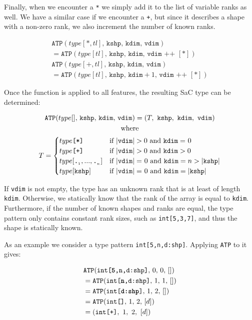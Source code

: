 \documentclass[sigconf,screen]{acmart}
\newcommand{\tpdot}{\texttt{\textbf{.}}}
\newcommand{\tpplus}{\texttt{+}}
\newcommand{\tpstar}{\texttt{*}}
\newcommand{\rest}{\ensuremath{tl}}
\newcommand{\atp}[4]{\ensuremath{\texttt{ATP}(#1,\,#2,\,#3,\,#4)}}
\newcommand{\fshp}{\texttt{kshp}}
\newcommand{\fdim}{\texttt{kdim}}
\newcommand{\vdim}{\texttt{vdim}}
\begin{document}
Finally, when we encounter a \tpstar{} we simply add it to the list of variable ranks as well.
We have a similar case if we encounter a \tpplus{}, but since it describes a shape with a non-zero rank, we also increment the number of known ranks.

\begin{gather*}
  \atp{type[\tpstar,\rest]}{\fshp}{\fdim}{\vdim} \\
    = \atp{type[\rest]}{\fshp}{\fdim}{\vdim \text{ ++ } [\tpstar{}]}
  \\[2pt]
  \atp{type[\tpplus,\rest]}{\fshp}{\fdim}{\vdim} \\
    = \atp{type[\rest]}{\fshp}{\fdim+1}{\vdim \text{ ++ } [\tpstar{}]}
\end{gather*}

Once the function is applied to all features, the resulting SaC type can be determined:

\begin{gather*}
  \atp{type[]}{\fshp}{\fdim}{\vdim} = (T,\ \fshp,\ \fdim,\ \vdim) \\
  \text{where} \\
  T = \begin{cases}
    type\texttt{[*]}
      &\text{if } |\vdim| > 0 \text{ and } \fdim =\hspace{0.6pt} 0 \\
    type\texttt{[+]}
      &\text{if } |\vdim| > 0 \text{ and } \fdim > 0 \\
    type[\tpdot_{_1}, ..., \tpdot_{_n}]
      &\text{if } |\vdim| =\hspace{0.6pt} 0 \text{ and } \fdim = n > |\fshp| \\
    type[\fshp]
      &\text{if } |\vdim| =\hspace{0.6pt} 0 \text{ and } \fdim = |\fshp|
  \end{cases}
\end{gather*}

If \vdim{} is not empty, the type has an unknown rank that is at least of length \fdim{}.
Otherwise, we statically know that the rank of the array is equal to \fdim{}.
Furthermore, if the number of known shapes and ranks are equal, the type pattern only contains constant rank sizes, such as \texttt{int[5,3,7]}, and thus the shape is statically known.

As an example we consider a type pattern \texttt{int[5,n,d:shp]}.
Applying \texttt{ATP} to it gives:

\begin{align*}
  &\atp{\texttt{int[\textbf{5},n,d:shp]}}{0}{0}{[]} \\
  &= \atp{\texttt{int[\textbf{n},d:shp]}}{1}{1}{[]} \\
  &= \atp{\texttt{int[\textbf{d:shp}]}}{1}{2}{[]} \\
  &= \atp{\texttt{int[]}}{1}{2}{[d]} \\
  &= (\texttt{int[+]},\ 1,\ 2,\ [d])
\end{align*}
\end{document}
